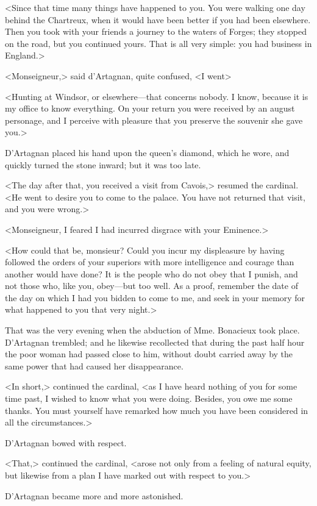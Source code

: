 <Since that time many things have happened to you. You were walking one day behind the Chartreux, when it would have been better if you had been elsewhere. Then you took with your friends a journey to the waters of Forges; they stopped on the road, but you continued yours. That is all very simple: you had business in England.> 

<Monseigneur,> said d'Artagnan, quite confused, <I went\longdash> 

<Hunting at Windsor, or elsewhere---that concerns nobody. I know, because it is my office to know everything. On your return you were received by an august personage, and I perceive with pleasure that you preserve the souvenir she gave you.> 

D'Artagnan placed his hand upon the queen's diamond, which he wore, and quickly turned the stone inward; but it was too late. 

<The day after that, you received a visit from Cavois,> resumed the cardinal. <He went to desire you to come to the palace. You have not returned that visit, and you were wrong.> 

<Monseigneur, I feared I had incurred disgrace with your Eminence.> 

<How could that be, monsieur? Could you incur my displeasure by having followed the orders of your superiors with more intelligence and courage than another would have done? It is the people who do not obey that I punish, and not those who, like you, obey---but too well. As a proof, remember the date of the day on which I had you bidden to come to me, and seek in your memory for what happened to you that very night.> 

That was the very evening when the abduction of Mme. Bonacieux took place. D'Artagnan trembled; and he likewise recollected that during the past half hour the poor woman had passed close to him, without doubt carried away by the same power that had caused her disappearance. 

<In short,> continued the cardinal, <as I have heard nothing of you for some time past, I wished to know what you were doing. Besides, you owe me some thanks. You must yourself have remarked how much you have been considered in all the circumstances.> 

D'Artagnan bowed with respect. 

<That,> continued the cardinal, <arose not only from a feeling of natural equity, but likewise from a plan I have marked out with respect to you.> 

D'Artagnan became more and more astonished. 


